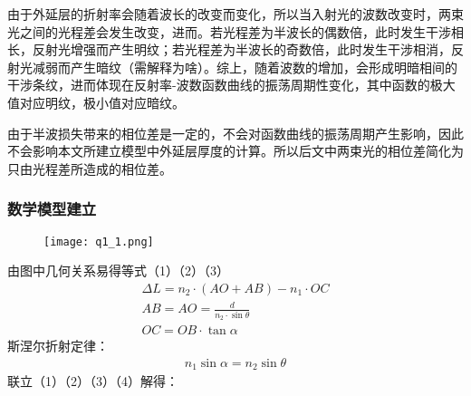 \documentclass{cumcmthesis}
\begin{document}
由于外延层的折射率会随着波长的改变而变化，所以当入射光的波数改变时，两束光之间的光程差会发生改变，进而。若光程差为半波长的偶数倍，此时发生干涉相长，反射光增强而产生明纹；若光程差为半波长的奇数倍，此时发生干涉相消，反射光减弱而产生暗纹（需解释为啥）。综上，随着波数的增加，会形成明暗相间的干涉条纹，进而体现在反射率-波数函数曲线的振荡周期性变化，其中函数的极大值对应明纹，极小值对应暗纹。

由于半波损失带来的相位差是一定的，不会对函数曲线的振荡周期产生影响，因此不会影响本文所建立模型中外延层厚度的计算。所以后文中两束光的相位差简化为只由光程差所造成的相位差。
\subsubsection{数学模型建立}
\begin{figure}[htbp]
	\centering
	\texttt{[image: q1\_1.png]}
	\caption{}
	\label{fig:q1_1}
	\end{figure}
由图中几何关系易得等式（1）（2）（3）
\begin{gather}
\Delta L = n_2 \cdot(AO + AB) -n_1\cdot OC\\
AB = AO = \frac{d}{n_2 \cdot\sin\theta } \\
OC = OB \cdot \tan\alpha 
\end{gather}
斯涅尔折射定律：
\begin{gather}
n_1 \sin \alpha = n_2 \sin \theta 
\end{gather}
联立（1）（2）（3）（4）解得：\\
\end{document}
